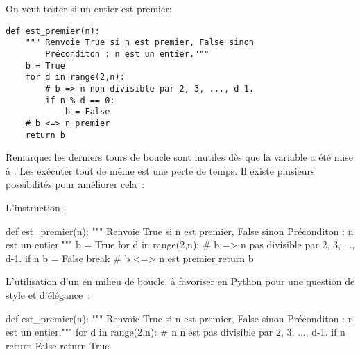 

On veut tester si un entier  est premier:


\begin{lstlisting}
def est_premier(n):
    """ Renvoie True si n est premier, False sinon
        Préconditon : n est un entier."""
    b = True
    for d in range(2,n):
        # b => n non divisible par 2, 3, ..., d-1.
        if n % d == 0:
            b = False
    # b <=> n premier
    return b
\end{lstlisting}

Remarque: les derniers tours de boucle sont inutiles dès que la
variable  a été mise à . Les exécuter tout de même est une perte de temps. Il 
existe plusieurs possibilités pour améliorer cela~:

L'instruction  :
\begin{pyverbatim}
def est_premier(n):
    """ Renvoie True si n est premier, False sinon
        Préconditon : n est un entier."""
    b = True
    for d in range(2,n):
        # b => n pas divisible par 2, 3, ..., d-1.
        if n %
            b = False
            break
    # b <=> n est premier
    return b
\end{pyverbatim}

L'utilisation d'un  en milieu de boucle, à favoriser en Python{} pour 
une question de style et d'élégance~:

\begin{pyverbatim}
def est_premier(n):
    """ Renvoie True si n est premier, False sinon
        Préconditon : n est un entier."""
    for d in range(2,n):
        # n n'est pas divisible par 2, 3, ..., d-1.
        if n %
            return False
    return True
\end{pyverbatim}